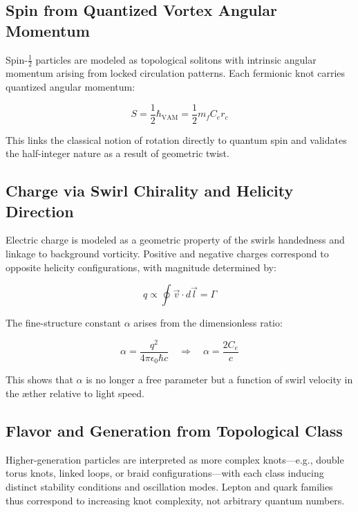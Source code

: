 \subsection{Spin from Quantized Vortex Angular Momentum}

Spin-$\tfrac{1}{2}$ particles are modeled as topological solitons with intrinsic angular momentum arising from locked circulation patterns. Each fermionic knot carries quantized angular momentum:

\begin{equation}
S = \frac{1}{2} \hbar_\text{VAM} = \frac{1}{2} m_f C_e r_c
\end{equation}

This links the classical notion of rotation directly to quantum spin and validates the half-integer nature as a result of geometric twist.

\subsection{Charge via Swirl Chirality and Helicity Direction}

Electric charge is modeled as a geometric property of the swirl\rqs s handedness and linkage to background vorticity. Positive and negative charges correspond to opposite helicity configurations, with magnitude determined by:

\begin{equation}
q \propto \oint \vec{v} \cdot d\vec{l} = \Gamma
\end{equation}

The fine-structure constant $\alpha$ arises from the dimensionless ratio:

\begin{equation}
\alpha = \frac{q^2}{4\pi \epsilon_0 \hbar c} \quad \Rightarrow \quad \alpha = \frac{2C_e}{c}
\end{equation}

This shows that $\alpha$ is no longer a free parameter but a function of swirl velocity in the æther relative to light speed.

\subsection{Flavor and Generation from Topological Class}

Higher-generation particles are interpreted as more complex knots---e.g., double torus knots, linked loops, or braid configurations---with each class inducing distinct stability conditions and oscillation modes. Lepton and quark families thus correspond to increasing knot complexity, not arbitrary quantum numbers.

